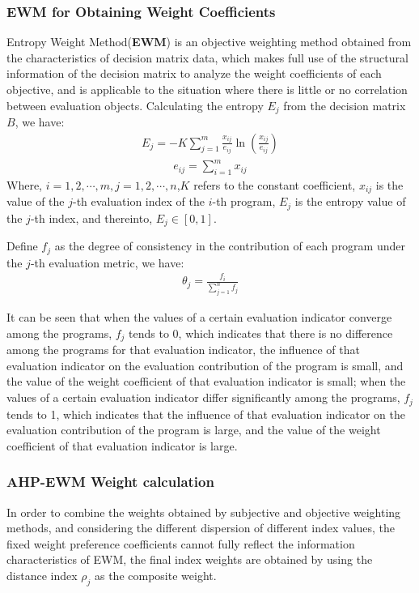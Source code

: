 \documentclass[12pt]{article}  %
\begin{document}
\subsubsection{EWM for Obtaining Weight Coefficients}
Entropy Weight Method(\textbf{EWM}) is an objective weighting method obtained from the characteristics of decision matrix data, which makes full use of the structural information of the decision matrix to analyze the weight coefficients of each objective, and is applicable to the situation where there is little or no correlation between evaluation objects.
Calculating the entropy $E_j$ from the decision matrix $B$, we have:
\begin{eqnarray}
E_j=-K\sum_{j=1}^{m}\frac{x_{ij}}{e_{ij}}\ln(\frac{x_{ij}}{e_{ij}})
\end{eqnarray}
\begin{eqnarray}
e_{ij}=\sum_{i=1}^{m}x_{ij}
\end{eqnarray}
Where, $i=1,2,\cdots,m,j=1,2,\cdots ,n$,$K$ refers to the constant coefficient, $x_{ij}$ is the value of the $j$-th evaluation index of the $i$-th program, $ E_j$ is the entropy value of the $j$-th index, and thereinto, $E_j\in [0,1]$.

Define $f_j$ as the degree of consistency in the contribution of each program under the $j$-th evaluation metric, we have:
\begin{eqnarray}
\theta _j=\frac{f_i}{\sum_{j=1}^{n}f_j}
\end{eqnarray}

It can be seen that when the values of a certain evaluation indicator converge among the programs, $f_j$ tends to 0, which indicates that there is no difference among the programs for that evaluation indicator, the influence of that evaluation indicator on the evaluation contribution of the program is small, and the value of the weight coefficient of that evaluation indicator is small; when the values of a certain evaluation indicator differ significantly among the programs, $f_j$tends to 1, which indicates that the influence of that evaluation indicator on the evaluation contribution of the program is large, and the value of the weight coefficient of that evaluation indicator is large.
\subsubsection{AHP-EWM Weight calculation}
In order to combine the weights obtained by subjective and objective weighting methods, and considering the different dispersion of different index values, the fixed weight preference coefficients cannot fully reflect the information characteristics of EWM, the final index weights are obtained by using the distance index $\rho _j$ as the composite weight.
\end{document}
